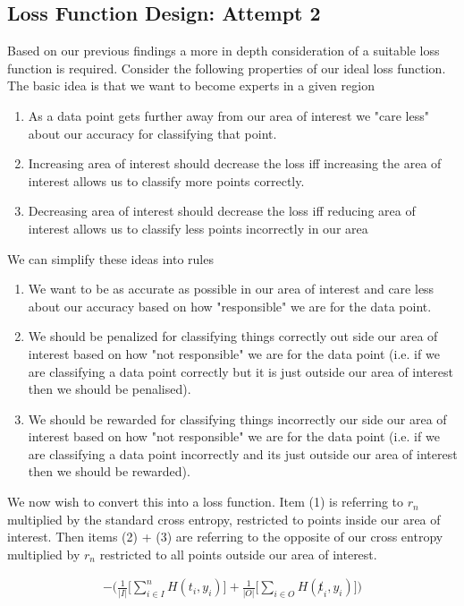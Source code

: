 \documentclass{article}
\theoremstyle{definition}
\begin{document}
\subsection{Loss Function Design: Attempt 2}
Based on our previous findings a more in depth consideration of a suitable loss function is required. Consider the following properties of our ideal loss function. The basic idea is that we want to become experts in a given region
\begin{enumerate}
\item As a data point gets further away from our area of interest we "care less" about our accuracy for classifying that point.
\item Increasing area of interest should decrease the loss iff increasing the area of interest allows us to classify more points correctly.
\item Decreasing area of interest should decrease the loss iff reducing area of interest allows us to classify less points incorrectly in our area
\end{enumerate}

We can simplify these ideas into rules

\begin{enumerate}
\item We want to be as accurate as possible in our area of interest and care less about our accuracy based on how "responsible" we are for the data point.
\item We should be penalized for classifying things correctly out side our area of interest based on how "not responsible" we are for the data point (i.e. if we are classifying a data point correctly but it is just outside our area of interest then we should be penalised).
\item We should be rewarded for classifying things incorrectly our side our area of interest based on how "not responsible" we are for the data point (i.e. if we are classifying a data point incorrectly and its just outside our area of interest then we should be rewarded).
\end{enumerate}

We now wish to convert this into a loss function. Item (1) is referring to $r_n$ multiplied by the standard cross entropy, restricted to points inside our area of interest. Then items (2) + (3) are referring to the opposite of our cross entropy multiplied by $r_n$ restricted to all points outside our area of interest.

\begin{align}
- \big( \frac{1}{|I|} \big[ \sum_{i \in I}^n H(t_i, y_i) \big] + \frac{1}{|O|} \big[ \sum_{i \in O} H(\not t_i, y_i) \big] \big)
\end{align}
\end{document}
